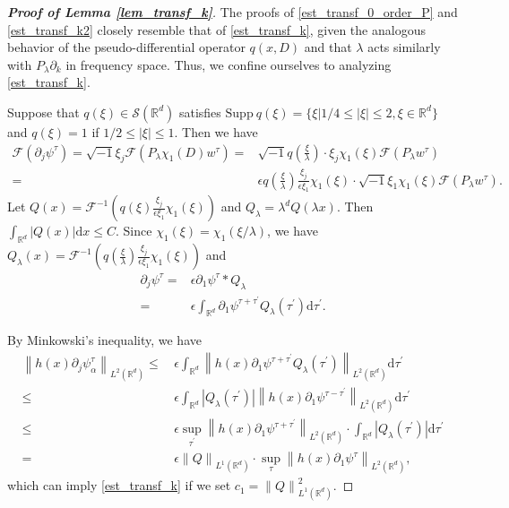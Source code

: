 \documentclass[10pt,twoside,a4paper]{article}
\numberwithin{equation}{section}\allowdisplaybreaks
\def\leq{\leqslant}
\begin{document}
\begin{appendices}
\begin{proof} [\textbf{Proof of Lemma \ref{lem_transf_k}}]
	The proofs of \eqref{est_transf_0_order_P} and \eqref{est_transf_k2} closely resemble that of \eqref{est_transf_k}, given the analogous behavior of the pseudo-differential operator  $ q(x,D) $ and that $ \lambda $ acts similarly with $ P_\lambda\partial_k  $ in frequency space. Thus, we confine ourselves to analyzing \eqref{est_transf_k}.	
	
	Suppose  that $ q(\xi ) \in \mathcal{S}(\mathbb{R}^d)  $ satisfies $ \mathrm{Supp}~ q(\xi )= \{ \xi |1/4\leq |\xi| \leq 2, \xi \in \mathbb{R}^d\}$ and $ q(\xi)=1  $ if $ 1/2\leq |\xi| \leq 1 $.   Then we have
	\begin{align*}
		\mathcal{F} ( \partial_j \psi^\tau ) =   \sqrt{-1}\xi_j 	\mathcal{F}   (P_{\lambda} \chi_1(D)  w^\tau ) =&\sqrt{-1} q\left(\frac{\xi}{\lambda} \right) \cdot  \xi_j  \chi_1 \left( \xi \right)\mathcal{F}  (P_{\lambda} w^\tau )\\
		=&\epsilon q\left(\frac{\xi}{\lambda} \right) \frac{\xi_j}{\epsilon\xi_ 1} \chi_1 \left( \xi \right) \cdot \sqrt{-1}   \xi_1  \chi_1 \left( \xi \right)\mathcal{F}  (P_{\lambda} w^\tau ).
	\end{align*}
	Let  $ Q(x) =\mathcal{F}^{-1}  \left(q\left( \xi\right)  \frac{\xi_j}{\epsilon \xi_ 1} \chi_1 \left( \xi \right)\right)$ and 	$ Q_\lambda= \lambda^d Q(\lambda x ) $. Then   $ \int_{\mathbb{R}^d} | Q(x)| \mathrm{d} x \leq C$. Since $ \chi_1 \left( \xi \right)= \chi_1 \left( \xi /\lambda\right)$, we have   $  Q_\lambda (x) = \mathcal{F}^{-1}  \left(q\left(\frac{\xi}{\lambda} \right) \frac{\xi_j}{\epsilon\xi_ 1} \chi_1 \left( \xi \right)\right)$
	and 
	\begin{align*}
		\partial_j \psi^{\tau}=& \epsilon  \partial_1 \psi^{\tau} *Q_\lambda\\
		=& \epsilon \int_{\mathbb{R}^{d}}\partial_1 \psi^{\tau+\tau^\prime} Q_\lambda(\tau^\prime)  \mathrm{d} \tau^\prime.
	\end{align*}
	
	By Minkowski's inequality, we have
	\begin{align*}
		\left\| h (x) \partial_j \psi_\alpha^\tau \right\|_{L^{2}(\mathbb{R}^d)} \leq& \, \epsilon\int_{\mathbb{R}^{d}}  \left\|  h (x)  \partial_1 \psi^{\tau+\tau^\prime} Q_\lambda(\tau^\prime) \right\|_{L^{2}(\mathbb{R}^d)}  \mathrm{d} \tau^\prime\\
		\leq & \,\epsilon\int_{\mathbb{R}^{d}}  \left| Q_\lambda(\tau^\prime)\right|   \left\|  h (x)  \partial_1 \psi^{\tau-\tau^\prime} \right\|_{L^{2}(\mathbb{R}^d)} \mathrm{d} \tau^\prime\\
		\leq &\, \epsilon\sup_{\tau^\prime}  \left\|  h (x)  \partial_1 \psi^{\tau+\tau^\prime} \right\|_{L^{2}(\mathbb{R}^d)} \cdot  \int_{\mathbb{R}^{d}}  \left| Q_\lambda(\tau^\prime)\right|    \mathrm{d} \tau^\prime\\
		=& \,\epsilon \left\|Q\right\|_{L^1(\mathbb{R}^d)} \cdot \sup_{\tau}  \left\|  h (x)  \partial_1 \psi^{\tau} \right\|_{L^{2}(\mathbb{R}^d)},
	\end{align*}
	which can imply \eqref{est_transf_k} if we set $ c_1=  \left\|Q\right\|_{L^1(\mathbb{R}^d)}^2.  $	
	

\end{proof}
\end{appendices}
\end{document}
